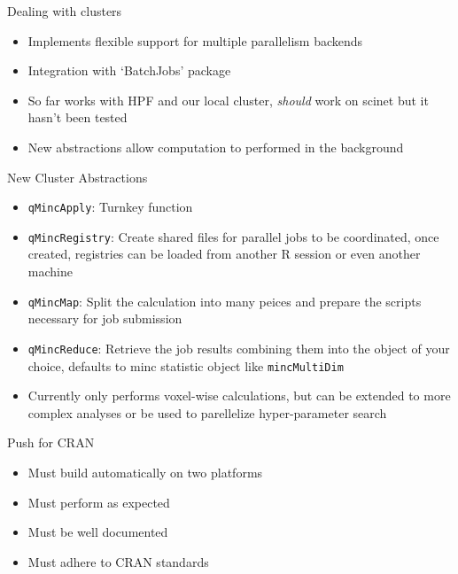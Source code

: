 \begin{frame}{Dealing with clusters}

\begin{itemize}
\tightlist
\item
  Implements flexible support for multiple parallelism backends
\item
  Integration with `BatchJobs' package
\item
  So far works with HPF and our local cluster, \emph{should} work on
  scinet but it hasn't been tested
\item
  New abstractions allow computation to performed in the background
\end{itemize}

\end{frame}

\begin{frame}{New Cluster Abstractions}

\begin{itemize}
\tightlist
\item
  \texttt{qMincApply}: Turnkey function
\item
  \texttt{qMincRegistry}: Create shared files for parallel jobs to be
  coordinated, once created, registries can be loaded from another R
  session or even another machine
\item
  \texttt{qMincMap}: Split the calculation into many peices and prepare
  the scripts necessary for job submission
\item
  \texttt{qMincReduce}: Retrieve the job results combining them into the
  object of your choice, defaults to minc statistic object like
  \texttt{mincMultiDim}
\item
  Currently only performs voxel-wise calculations, but can be extended
  to more complex analyses or be used to parellelize hyper-parameter
  search
\end{itemize}

\end{frame}

\begin{frame}{Push for CRAN}

\begin{itemize}
\tightlist
\item
  Must build automatically on two platforms
\item
  Must perform as expected
\item
  Must be well documented
\item
  Must adhere to CRAN standards
\end{itemize}

\end{frame}

